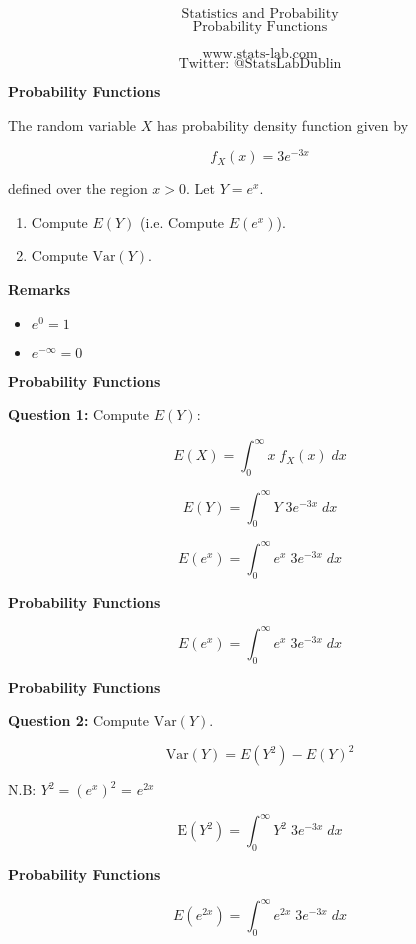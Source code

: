 \documentclass[12pt]{article}
\begin{document}
\Huge
\[\mbox{Statistics and Probability}\]
\LARGE
\[\mbox{Probability Functions}\]

\Large
\[\mbox{www.stats-lab.com}\]
\[\mbox{Twitter: @StatsLabDublin}\]

\newpage

{\LARGE
\begin{center}
\textbf{Probability Functions}\\
\end{center}
\bigskip
The random variable $X$ has probability density function given by

\[f_X(x) = 3e^{-3x}\]

defined over the region $x>0$. Let $Y=e^x$.
\begin{enumerate}
\item Compute $E(Y)$ (i.e. Compute $E(e^x)$).
\item Compute $\mbox{Var}(Y)$.
\end{enumerate}
\bigskip
\textbf{Remarks}
\begin{itemize}
\item $e^0=1$
\item $e^{-\infty} =0$
\end{itemize}

}
\newpage
{\LARGE
\begin{center}
\textbf{Probability Functions}\\
\end{center}
\bigskip
\textbf{Question 1:}
Compute $E(Y)$:
\begin{framed}
\[ E(X) = \int^{\infty}_{0}x\;f_X(x) \;dx\]  
\end{framed}

\[E(Y) = \int^{\infty}_{0}Y\;3e^{-3x} \;dx\]

\[E(e^x) = \int^{\infty}_{0}e^x\;3e^{-3x} \;dx\]
}
\newpage
{\LARGE
\begin{center}
\textbf{Probability Functions}\\
\end{center}
\[E(e^x) = \int^{\infty}_{0}e^x\;3e^{-3x} \;dx\]
}

\newpage
{\LARGE
\begin{center}
\textbf{Probability Functions}\\
\end{center}
\bigskip
\textbf{Question 2:}
Compute $\mbox{Var}(Y)$.\bigskip
\begin{framed}
\[ \mbox{Var}(Y) = E(Y^2) - E(Y)^2  \]
\end{framed}
\begin{center}
N.B:  $  Y^2 = (e^{x})^2$ =  $e^{2x}$
\end{center}
\bigskip
\bigskip
\[\mbox{E}(Y^2) = \int^{\infty}_{0}Y^2\;3e^{-3x} \;dx\]


}
\newpage
{\LARGE
\begin{center}
\textbf{Probability Functions}\\
\end{center}
\[E(e^{2x}) = \int^{\infty}_{0}e^{2x}\;3e^{-3x} \;dx\]
}
\end{document}

